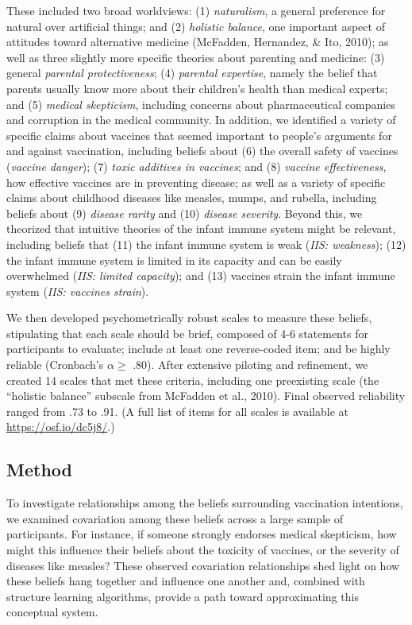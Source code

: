 \documentclass[10pt, letterpaper]{article}
\begin{document}
These included two broad worldviews: (1) \emph{naturalism}, a general
preference for natural over artificial things; and (2) \emph{holistic
balance}, one important aspect of attitudes toward alternative medicine
(McFadden, Hernandez, \& Ito, 2010); as well as three slightly more
specific theories about parenting and medicine: (3) general
\emph{parental protectiveness}; (4) \emph{parental expertise}, namely
the belief that parents usually know more about their children's health
than medical experts; and (5) \emph{medical skepticism}, including
concerns about pharmaceutical companies and corruption in the medical
community. In addition, we identified a variety of specific claims about
vaccines that seemed important to people's arguments for and against
vaccination, including beliefs about (6) the overall safety of vaccines
(\emph{vaccine danger}); (7) \emph{toxic additives in vaccines}; and (8)
\emph{vaccine effectiveness}, how effective vaccines are in preventing
disease; as well as a variety of specific claims about childhood
diseases like measles, mumps, and rubella, including beliefs about (9)
\emph{disease rarity} and (10) \emph{disease severity}. Beyond this, we
theorized that intuitive theories of the infant immune system might be
relevant, including beliefs that (11) the infant immune system is weak
(\emph{IIS: weakness}); (12) the infant immune system is limited in its
capacity and can be easily overwhelmed (\emph{IIS: limited capacity});
and (13) vaccines strain the infant immune system (\emph{IIS: vaccines
strain}).

We then developed psychometrically robust scales to measure these
beliefs, stipulating that each scale should be brief, composed of 4-6
statements for participants to evaluate; include at least one
reverse-coded item; and be highly reliable (Cronbach's \(\alpha \geq\)
.80). After extensive piloting and refinement, we created 14 scales that
met these criteria, including one preexisting scale (the ``holistic
balance'' subscale from McFadden et al., 2010). Final observed
reliability ranged from .73 to .91. (A full list of items for all scales
is available at \url{https://osf.io/dc5j8/}.)

\subsection{Method}\label{method}

To investigate relationships among the beliefs surrounding vaccination
intentions, we examined covariation among these beliefs across a large
sample of participants. For instance, if someone strongly endorses
medical skepticism, how might this influence their beliefs about the
toxicity of vaccines, or the severity of diseases like measles? These
observed covariation relationships shed light on how these beliefs hang
together and influence one another and, combined with structure learning
algorithms, provide a path toward approximating this conceptual system.
\end{document}
